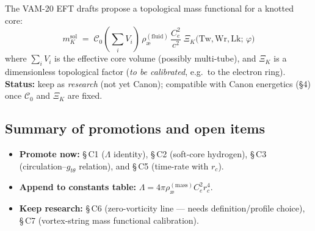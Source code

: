 \documentclass[11pt,a4paper]{article}
\begin{document}
    The VAM-20 EFT drafts propose a topological mass functional for a knotted core:
    \[
        \boxed{ m_{K}^{\text{sol}} \;=\; \mathcal{C}_0 \left(\sum_i V_i\right)\,
        \rho_{\text{\ae}}^{(\text{fluid})}\,\frac{C_e^2}{c^2}\;
        \Xi_{K}\!\Big(\mathrm{Tw},\mathrm{Wr},\mathrm{Lk};\,\varphi\Big) }
    \]
    where $\sum_i V_i$ is the effective core volume (possibly multi-tube), and $\Xi_K$ is a dimensionless topological factor (\emph{to be calibrated}, e.g.\ to the electron ring).
    \textbf{Status:} keep as \emph{research} (not yet Canon); compatible with Canon energetics (\S4) once $\mathcal{C}_0$ and $\Xi_K$ are fixed.

    \subsection*{Summary of promotions and open items}
    \begin{itemize}
        \item \textbf{Promote now:} \S\,C1 ($\Lambda$ identity), \S\,C2 (soft-core hydrogen), \S\,C3 (circulation–$g_{t\theta}$ relation), and \S\,C5 (time-rate with $r_c$).
        \item \textbf{Append to constants table:} $\Lambda=4\pi\rho_{\text{\ae}}^{(\text{mass})}C_e^2 r_c^4$.
        \item \textbf{Keep research:} \S\,C6 (zero-vorticity line — needs definition/profile choice), \S\,C7 (vortex-string mass functional calibration).
    \end{itemize}
\end{document}
